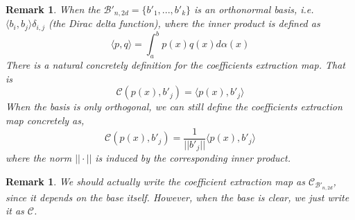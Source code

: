 \documentclass[12pt]{amsart}
\numberwithin{equation}{section}
\newtheorem{remark}[thm]{Remark}
\theoremstyle{definition}
\numberwithin{thm}{section}
\begin{document}
\begin{remark}
     When the $\mathcal{B'}_{n, 2d} = \{b'_1,... ,b'_k\}$ is an orthonormal basis, 
     i.e. $\langle b_i, b_j \rangle \delta_{i,j}$ (the Dirac delta function), where the inner product is defined as
     \begin{equation*} 
          \langle p, q \rangle = \int_a^b p(x) q(x) d\alpha(x)
     \end{equation*}
     There is a natural concretely definition for the \emph{coefficients extraction map}. 
     That is
     \begin{equation*}
          \mathcal{C}(p(x), b'_j) = \langle p(x), b'_j \rangle
     \end{equation*}
     When the basis is only orthogonal, we can still define the \emph{coefficients extraction map} concretely as,
     \begin{equation*}
          \mathcal{C}(p(x), b'_j) = \frac{1}{||b'_j||}\langle p(x), b'_j \rangle 
     \end{equation*}
     where the norm $|| \cdot ||$ is induced by the corresponding inner product.
\end{remark}

\begin{remark}
     We should actually write the \emph{coefficient extraction map} as $\mathcal{C}_{\mathcal{B'}_{n,2d}}$,
     since it depends on the base itself. However, when the base is clear, we just write it as $\mathcal{C}$.
\end{remark}
\end{document}

